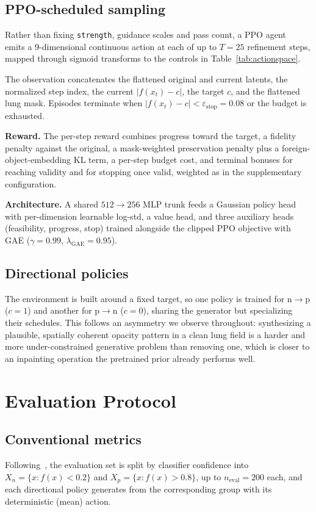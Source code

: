 \documentclass[10pt,twocolumn,letterpaper]{article}
\begin{document}
\subsection{PPO-scheduled sampling}
Rather than fixing \texttt{strength}, guidance scales and pass count, a
PPO agent~\cite{schulman2017ppo} emits a 9-dimensional continuous action
at each of up to $T=25$ refinement steps, mapped through sigmoid
transforms to the controls in Table~\ref{tab:actionspace}.

The observation concatenates the flattened original and current latents,
the normalized step index, the current $|f(x_t)-c|$, the target $c$, and
the flattened lung mask. Episodes terminate when $|f(x_t)-c|<\varepsilon_{\text{stop}}=0.08$
or the budget is exhausted.

\textbf{Reward.} The per-step reward combines progress toward the
target, a fidelity penalty against the original, a mask-weighted
preservation penalty plus a foreign-object-embedding KL term, a per-step
budget cost, and terminal bonuses for reaching validity and for stopping
once valid, weighted as in the supplementary configuration.

\textbf{Architecture.} A shared $512\to256$ MLP trunk feeds a Gaussian
policy head with per-dimension learnable log-std, a value head, and
three auxiliary heads (feasibility, progress, stop) trained alongside the
clipped PPO objective with GAE ($\gamma=0.99$, $\lambda_{\text{GAE}}=0.95$).

\subsection{Directional policies}
The environment is built around a fixed target, so one policy is trained
for n$\to$p ($c=1$) and another for p$\to$n ($c=0$), sharing the
generator but specializing their schedules. This follows an asymmetry we
observe throughout: synthesizing a plausible, spatially coherent opacity
pattern in a clean lung field is a harder and more under-constrained
generative problem than removing one, which is closer to an inpainting
operation the pretrained prior already performs well.

\section{Evaluation Protocol}
\label{sec:evalprotocol}

\subsection{Conventional metrics}
\label{sec:conventional}
Following~\cite{singla2022}, the evaluation set is split by classifier
confidence into $X_n=\{x:f(x)<0.2\}$ and $X_p=\{x:f(x)>0.8\}$, up to
$n_{\text{eval}}=200$ each, and each directional policy generates from
the corresponding group with its deterministic (mean) action.
\end{document}
